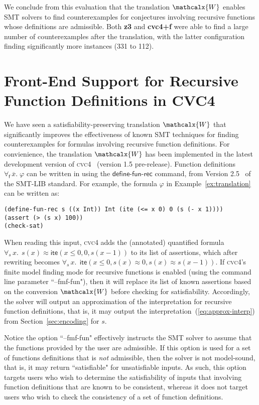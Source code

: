 \documentclass[runningheads,a4paper]{llncs}
\newcommand{\con}[1]{\mathsf{#1}}
\renewcommand\vec[1]{\overline{#1}}
\newcommand{\cvc}{\textsc{cvc}{\small 4}\xspace}
\newcommand{\teq}{\approx}
\newcommand{\conv}{\mathcalx{W}}
\newcommand{\lite}{\con{ite}}
\newcommand{\forallf}[1]{\forall_{\!#1\:}}
\newcommand{\definefunreccmd}{\con{define}\text{-}\con{fun}\text{-}\con{rec}}
\begin{document}
We conclude from this evaluation that the translation $\conv$ enables SMT solvers to find counterexamples 
for conjectures involving recursive functions whose definitions are admissible.
Both {\bf z3} and {\bf cvc4+f} were able to find a large number of counterexamples after the translation,
with the latter configuration finding significantly more instances (331 to 112).

\section{Front-End Support for Recursive Function Definitions in CVC4}
\label{sec:front-end}

We have seen a satisfiability-preserving translation $\conv$ that significantly improves the effectiveness of known SMT techniques
for finding counterexamples for formulas involving recursive function definitions.
For convienience, the translation $\conv$ has been implemented in the latest development version of \cvc~\cite{ReyEtAl-1-RR-13} (version 1.5 pre-release).
Function definitions $\forallf{\con{f}} \vec x.\; \varphi$ can be written in using the $\definefunreccmd$ command, 
from Version 2.5~\cite{} of the SMT-LIB standard.
For example, the formula $\varphi$ in Example~\ref{ex:translation} 
can be written as:

{\small
\begin{verbatim}
(define-fun-rec s ((x Int)) Int (ite (<= x 0) 0 (s (- x 1))))
(assert (> (s x) 100))
(check-sat)
\end{verbatim}
}

When reading this input, 
\cvc adds the (annotated) quantified formula $\forallf{s} x.\;\, s( x ) \teq \lite( x \leq 0, 0, s( x-1 ) )$ to its list of assertions,
which after rewriting becomes $\forallf{s} x.\;\, \lite( x \leq 0, s( x ) \teq 0, s( x ) \teq s( x-1 ) )$.
If \cvc's finite model finding mode for recursive functions is enabled (using the command line parameter ``--fmf-fun"),
then it will replace its list of known assertions based on the conversion $\conv$ before checking for satisfiability.
Accordingly, the solver will output an approximation of the interpretation for recursive function definitions,
that is, it may output the interpretation~(\ref{eq:approx-interp}) from Section~\ref{sec:encoding} for $s$.

Notice the option ``--fmf-fun" effectively instructs the SMT solver to assume that the functions provided by the user are admissible.
If this option is used for a set of functions definitions that is \emph{not} admissible, then the solver is not model-sound, that is, 
it may return ``satisfiable" for unsatisfiable inputs.
As such,
this option targets users who wish to determine the satisfiability of inputs that involving function definitions that are known to be consistent,
whereas it does not target users who wish to check the consistency of a set of function definitions.
\end{document}

